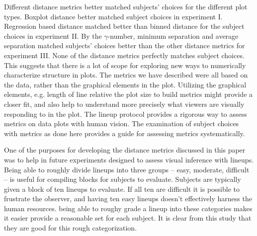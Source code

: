 \documentclass[12pt]{article}\usepackage[]{graphicx}\usepackage[]{color}
\begin{document}
Different distance metrics better matched subjects' choices for the different plot types. Boxplot distance better matched subject choices in experiment I. Regression based distance matched better than binned distance for the subject choices in experiment II. By the $\gamma$-number, minimum separation and average separation matched subjects' choices better than the other distance metrics for experiment III. 
None of the distance metrics perfectly matches subject choices. This suggests that there is a lot of scope for exploring new ways to numerically characterize structure in plots. The metrics we have described were all based on the data, rather than the graphical elements in the plot. Utilizing the graphical elements, e.g. length of line relative the plot size to build metrics might provide a closer fit, and also help to understand more precisely what viewers are visually responding to in the plot. The lineup protocol provides a rigorous way to assess metrics on data plots with human vision. The examination of subject choices with metrics as done here provides a guide for assessing metrics systematically.

One of the purposes for developing the distance metrics discussed in this paper was to help in future experiments designed to assess visual inference with lineups. Being able to roughly divide lineups into three groups -- easy, moderate, difficult -- is useful for compiling blocks for subjects to evaluate. Subjects are typically given a block of ten lineups to evaluate. If all ten are difficult it is possible to frustrate the observer, and having ten easy lineups doesn't effectively harness the human resources. being able to roughy grade a lineup into these categories makes it easier  provide a reasonable set for each subject.  It is clear from this study that they are good for this rough categorization. 




\end{document}
